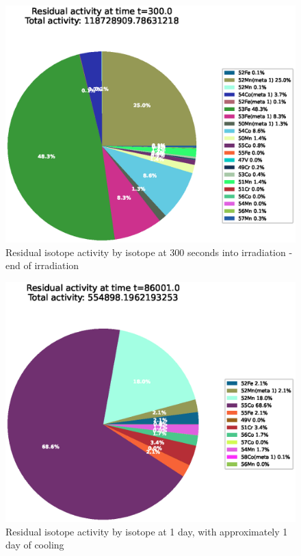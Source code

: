 \begin{figure}[!htb]
\centering
\includegraphics[width=0.8\linewidth]{chapters/activity_code/fe-activity-v2/residual-activity/0100_300.eps}
\caption{Residual isotope activity by isotope at 300 seconds into irradiation - end of irradiation}
\label{fig:activity-v2-residual-activity-300s}
\end{figure}

\begin{figure}[!htb]
\centering
\includegraphics[width=0.8\linewidth]{chapters/activity_code/fe-activity-v2/residual-activity/0166_86001.eps}
\caption{Residual isotope activity by isotope at 1 day, with approximately 1 day of cooling}
\label{fig:activity-v2-residual-activity-86001s}
\end{figure}


